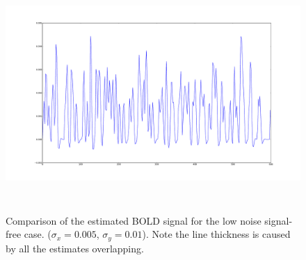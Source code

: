 \begin{figure}[H]
\centering
\includegraphics[clip=true,trim=6cm 3cm 6cm 3cm,height=9cm]{images/fits_noiseonly}
\caption[Results for non-active, low noise signal]  
{Comparison of the estimated \ac{BOLD} signal for the low noise signal-free case.
 ($\sigma_x = 0.005$, $\sigma_y = 0.01$). Note the line thickness is caused
by all the estimates overlapping.}
\label{fig:fits_noiseonly}
\end{figure}


